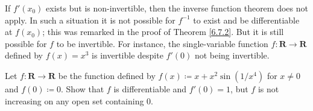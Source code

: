 \begin{note}
    If \(f'(x_0)\) exists but is non-invertible, then the inverse function theorem does not apply.
    In such a situation it is not possible for \(f^{-1}\) to exist and be differentiable at \(f(x_0)\);
    this was remarked in the proof of Theorem \ref{6.7.2}.
    But it is still possible for \(f\) to be invertible.
    For instance, the single-variable function \(f : \mathbf{R} \to \mathbf{R}\) defined by \(f(x) = x^3\) is invertible despite \(f'(0)\) not being invertible.
\end{note}

\exercisesection

\begin{exercise}\label{ex 6.7.1}
    Let \(f : \mathbf{R} \to \mathbf{R}\) be the function defined by \(f(x) \coloneqq x + x^2 \sin(1 / x^4)\) for \(x \neq 0\) and \(f(0) \coloneqq 0\).
    Show that \(f\) is differentiable and \(f'(0) = 1\), but \(f\) is not increasing on any open set containing \(0\).
\end{exercise}

